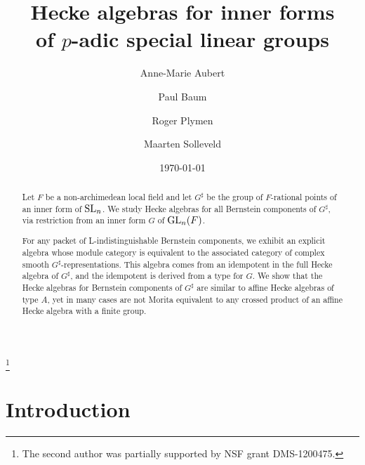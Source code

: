 \documentclass[11pt]{amsart}
\theoremstyle{definition}
\begin{document}
\title{Hecke algebras for inner forms\\ of $p$-adic special linear groups}

\author[A.-M. Aubert]{Anne-Marie Aubert}
\address{Institut de Math\'ematiques de Jussieu -- Paris Rive Gauche, 
U.M.R. 7586 du C.N.R.S., U.P.M.C., 4 place Jussieu 75005 Paris, France}
\author[P. Baum]{Paul Baum}
\address{Mathematics Department, Pennsylvania State University, University Park, PA 16802, USA}
\author[R. Plymen]{Roger Plymen}
\address{School of Mathematics, Southampton University, Southampton SO17 1BJ,  England 
\emph{and} School of Mathematics, Manchester University, Manchester M13 9PL, England}
\author[M. Solleveld]{Maarten Solleveld}
\address{Radboud Universiteit Nijmegen, Heyendaalseweg 135, 6525AJ Nijmegen, the Netherlands}
\date{\today}
\thanks{The second author was partially supported by NSF grant DMS-1200475.}
\maketitle

\begin{abstract}
Let $F$ be a non-archimedean local field and let $G^\sharp$ be the group of $F$-rational
points of an inner form of ${{\rm SL}}_n$. We study Hecke algebras for all Bernstein components 
of $G^\sharp$, via restriction from an inner form $G$ of ${{\rm GL}}_n (F)$. 

For any packet of L-indistinguishable Bernstein components, we exhibit an explicit
algebra whose module category is equivalent to the associated category of complex smooth
$G^\sharp$-representations. This algebra comes from an idempotent in the full Hecke 
algebra of $G^\sharp$, and the idempotent is derived from a type for $G$. We show that the 
Hecke algebras for Bernstein components of $G^\sharp$ are similar to affine Hecke algebras 
of type $A$, yet in many cases are not Morita equivalent to any crossed product of an 
affine Hecke algebra with a finite group.
\end{abstract}

\vspace{4mm}

\tableofcontents

\section*{Introduction}
\end{document}
